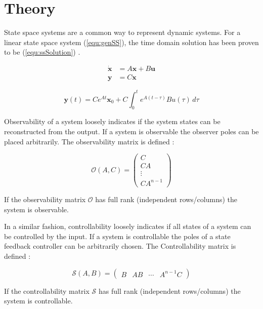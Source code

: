 \documentclass[a4paper, titlepage]{article}
\begin{document}
\section{Theory}
State space systems are a common way to represent dynamic systems.
For a linear state space system (\ref{equ:genSS}), the time domain solution has been proven to be (\ref{equ:ssSolution}) \citep[~p.189]{astrom21}.

\begin{equation}
\begin{split}
\dot{\textbf{x}} &= A\textbf{x} + B\textbf{u} \\
\textbf{y} &= C\textbf{x}
\end{split}
\label{equ:genSS}
\end{equation}

\begin{equation}
\textbf{y}(t) = Ce^{At}\textbf{x}_0 + C \int_{0}^{t} e^{A(t-\tau)}Bu(\tau) \,d\tau
\label{equ:ssSolution}
\end{equation}

Observability of a system loosely indicates if the system states can be reconstructed from the output. If a system is observable the observer poles can be placed arbitrarily.
The observability matrix is defined \citep[p.~45]{glad00}:

\begin{equation}
\mathcal{O}(A,C) = 
\begin{pmatrix}
C \\ CA \\ \vdots \\ CA^{n-1}
\end{pmatrix}
\label{equ:obsv}
\end{equation}

If the observability matrix $\mathcal{O}$ has full rank (independent rows/columns) the system is observable.

In a similar fashion, controllability loosely indicates if all states of a system can be controlled by the input. If a system is controllable the poles of a state feedback controller can be arbitrarily chosen.
The Controllability matrix is defined \citep[p.~45]{glad00}:

\begin{equation}
\mathcal{S}(A,B) = 
\begin{pmatrix}
B & AB & \cdots & A^{n-1}C
\end{pmatrix}
\label{equ:ctrb}
\end{equation}

If the controllability matrix $\mathcal{S}$ has full rank (independent rows/columns) the system is controllable.
\end{document}
